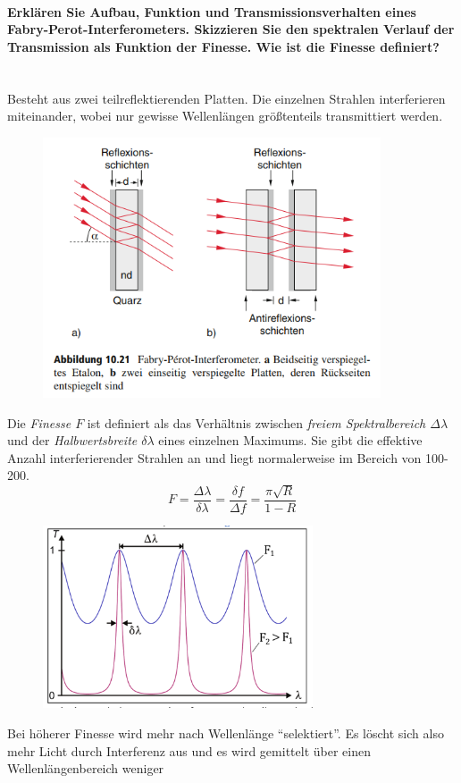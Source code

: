 \documentclass[a4paper, 11pt, ngerman, parskip=half-]{scrartcl}
\newcommand{\myparagraph}[1]{\paragraph{#1}\mbox{}\\}
\begin{document}
\myparagraph{Erklären Sie Aufbau, Funktion und Transmissionsverhalten eines
    Fabry-Perot-Interferometers. Skizzieren Sie den spektralen Verlauf der Transmission als Funktion der
    Finesse. Wie ist die Finesse definiert?}
Besteht aus zwei teilreflektierenden Platten. Die einzelnen Strahlen interferieren miteinander, wobei nur gewisse Wellenlängen größtenteils transmittiert werden.
\begin{figure}[H]
    \centering
    \includegraphics[width=10cm]{image/18_Interferenz/Fabry-Perot_Interferometer.png}
\end{figure}
Die \textit{Finesse $F$} ist definiert als das Verhältnis zwischen \textit{freiem Spektralbereich $\Delta\lambda$}
und der \textit{Halbwertsbreite $\delta\lambda$} eines einzelnen Maximums. Sie gibt die effektive Anzahl interferierender Strahlen an
und liegt normalerweise im Bereich von 100-200.
\begin{equation}
    F = \frac{\Delta \lambda}{\delta \lambda} = \frac{\delta f}{\Delta f} = \frac{\pi \sqrt{R}}{1 - R}
\end{equation}
\begin{figure}[H]
    \centering
    \includegraphics[width=8cm]{image/18_Interferenz/Finesse.png}
\end{figure}
Bei höherer Finesse wird mehr nach Wellenlänge \enquote{selektiert}. Es löscht sich also mehr Licht durch Interferenz aus und es wird gemittelt über einen Wellenlängenbereich weniger
\end{document}
